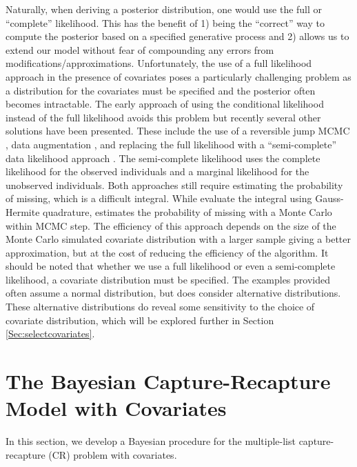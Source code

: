 \documentclass[
  12pt,
]{article}
\begin{document}
Naturally, when deriving a posterior distribution, one would use the
full or ``complete'' likelihood. This has the benefit of 1) being the
``correct'' way to compute the posterior based on a specified generative
process and 2) allows us to extend our model without fear of compounding
any errors from modifications/approximations. Unfortunately, the use of
a full likelihood approach in the presence of covariates poses a
particularly challenging problem as a distribution for the covariates
must be specified and the posterior often becomes intractable. The early
approach of using the conditional likelihood instead of the full
likelihood avoids this problem but recently several other solutions have
been presented. These include the use of a reversible jump MCMC
\citep{king_bayesian_2008}, data augmentation
\citep{royle_analysis_2007,royle_analysis_2009}, and replacing the full
likelihood with a ``semi-complete'' data likelihood approach
\citep{king_capturerecapture_2016}. The semi-complete likelihood uses
the complete likelihood for the observed individuals and a marginal
likelihood for the unobserved individuals. Both approaches still require
estimating the probability of missing, which is a difficult integral.
While \citep{king_capturerecapture_2016} evaluate the integral using
Gauss-Hermite quadrature, \cite{bonner_mcmcmc_2014} estimates the
probability of missing with a Monte Carlo within MCMC step. The
efficiency of this approach depends on the size of the Monte Carlo
simulated covariate distribution with a larger sample giving a better
approximation, but at the cost of reducing the efficiency of the
algorithm. It should be noted that whether we use a full likelihood or
even a semi-complete likelihood, a covariate distribution must be
specified. The examples provided often assume a normal distribution, but
\cite{royle_analysis_2009} does consider alternative distributions.
These alternative distributions do reveal some sensitivity to the choice
of covariate distribution, which will be explored further in Section
\ref{Sec:selectcovariates}.

\newpage
\section{The Bayesian Capture-Recapture Model with Covariates}
\label{sec:CRwithCovariates}

In this section, we develop a Bayesian procedure for the multiple-list
capture-recapture (CR) problem with covariates.
\end{document}
